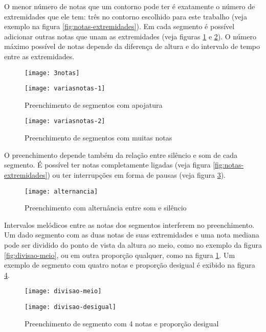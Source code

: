 \documentclass[12pt]{article}
\begin{document}
O menor número de notas que um contorno pode ter é exatamente o número
de extremidades que ele tem: três no contorno escolhido para este
trabalho (veja exemplo na figura \ref{fig:notas-extremidades}). Em
cada segmento é possível adicionar outras notas que unam as
extremidades (veja figuras \ref{fig:varias-apojatura} e
\ref{fig:muitas-notas}). O número máximo possível de notas depende da
diferença de altura e do intervalo de tempo entre as extremidades.

\begin{figure}[h]
\begin{minipage}{8cm}
  \centering
  \texttt{[image: 3notas]}
  \caption{Preenchimento com notas apenas nas extremidades}
  \label{fig:notas-extremidades}
\end{minipage}
\hfill
\begin{minipage}{8cm}
  \centering
  \texttt{[image: variasnotas-1]}
  \caption{Preenchimento de segmentos com apojatura}
  \label{fig:varias-apojatura}
\end{minipage}
\hfill
\end{figure}

\begin{figure}[h]
  \centering
  \texttt{[image: variasnotas-2]}
  \caption{Preenchimento de segmentos com muitas notas}
  \label{fig:muitas-notas}
\end{figure}

O preenchimento depende também da relação entre silêncio e som de cada
segmento. É possível ter notas completamente ligadas (veja figura
\ref{fig:notas-extremidades}) ou ter interrupções em forma de pausas
(veja figura \ref{fig:alternancia}).

\begin{figure}[h]
  \centering
  \texttt{[image: alternancia]}
  \caption{Preenchimento com alternância entre som e silêncio}
  \label{fig:alternancia}
\end{figure}

Intervalos melódicos entre as notas dos segmentos interferem no
preenchimento. Um dado segmento com as duas notas de suas extremidades
e uma nota mediana pode ser dividido do ponto de vista da altura ao
meio, como no exemplo da figura \ref{fig:divisao-meio}, ou em outra
proporção qualquer, como na figura \ref{fig:varias-apojatura}. Um
exemplo de segmento com quatro notas e proporção desigual é exibido na
figura \ref{fig:divisao-desigual}.

\begin{figure}[h]
\begin{minipage}{8cm}
  \centering
  \texttt{[image: divisao-meio]}
  \caption{Preenchimento de segmento com 3 notas com proporção de 1:1}
  \label{fig:divisao-meio}
\end{minipage}
\hfill
\begin{minipage}{8cm}
  \centering
  \texttt{[image: divisao-desigual]}
  \caption{Preenchimento de segmento com 4 notas e proporção desigual}
  \label{fig:divisao-desigual}
\end{minipage}
\hfill
\end{figure}
\end{document}
